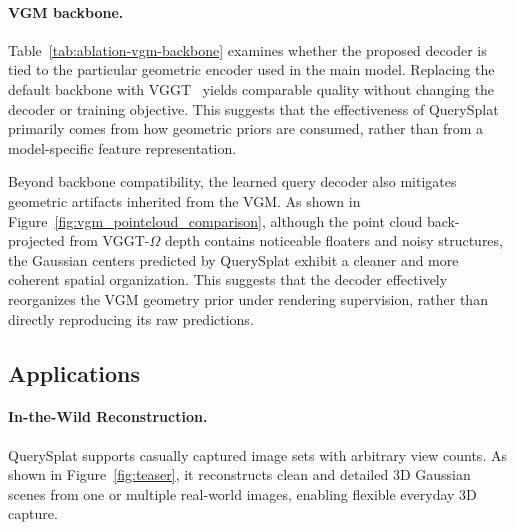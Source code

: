 \documentclass[letterpaper]{article} %
\begin{document}
\paragraph{VGM backbone.}
Table~\ref{tab:ablation-vgm-backbone} examines whether the proposed decoder is tied to the particular geometric encoder used in the main model. Replacing the default backbone with VGGT~\cite{wang2025vggt} yields comparable quality without changing the decoder or training objective. This suggests that the effectiveness of QuerySplat primarily comes from how geometric priors are consumed, rather than from a model-specific feature representation. 

Beyond backbone compatibility, the learned query decoder also mitigates geometric artifacts inherited from the VGM. As shown in Figure~\ref{fig:vgm_pointcloud_comparison}, although the point cloud back-projected from VGGT-$\Omega$ depth contains noticeable floaters and noisy structures, the Gaussian centers predicted by QuerySplat exhibit a cleaner and more coherent spatial organization. This suggests that the decoder effectively reorganizes the VGM geometry prior under rendering supervision, rather than directly reproducing its raw predictions.









\subsection{Applications}
\label{sec:applications}

\paragraph{In-the-Wild Reconstruction.}
QuerySplat supports casually captured image sets with arbitrary view counts. As shown in Figure~\ref{fig:teaser}, it reconstructs clean and detailed 3D Gaussian scenes from one or multiple real-world images, enabling flexible everyday 3D capture.
\end{document}
